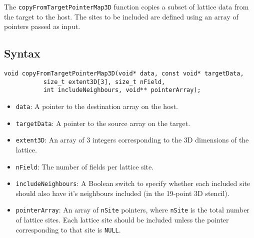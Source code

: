 The \verb+copyFromTargetPointerMap3D+ function copies a subset of lattice data from the target to the host. The sites to be included are defined using an array of pointers passed as input.

\subsection{Syntax}
\begin{verbatim}
void copyFromTargetPointerMap3D(void* data, const void* targetData, 
           size_t extent3D[3], size_t nField, 
           int includeNeighbours, void** pointerArray);
\end{verbatim}

\begin{itemize}
\item \verb+data+: A pointer to the destination array on the host.
\item \verb+targetData+: A pointer to the source array on the target.
\item \verb+extent3D+: An array of 3 integers corresponding to the 3D dimensions of the lattice.
\item \verb+nField+: The number of fields per lattice site.
\item \verb+includeNeighbours+: A Boolean switch to specify whether each included site should also have it's neighbours included (in the 19-point 3D stencil).
\item \verb+pointerArray+: An array of \verb+nSite+ pointers, where \verb+nSite+ is the total number of lattice sites. Each lattice site should be included unless the pointer corresponding to that site is \verb+NULL+.  
\end{itemize}


